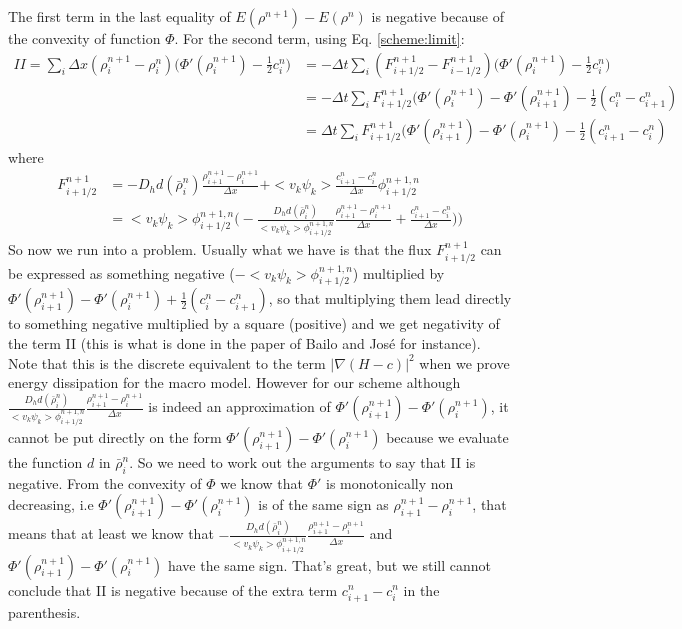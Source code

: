 \documentclass[review,onefignum,onetabnum]{siamart220329}
\begin{document}
{The first term in the last equality of $E(\rho^{n+1}) - E(\rho^n)$ is negative because of the convexity of function $\Phi$. For the second term, using Eq. \eqref{scheme:limit}:
\begin{equation*}
\begin{split}
II = \sum_i \Delta x (\rho_i^{n+1} - \rho_i^n) \big( \Phi'(\rho_i^{n+1}) - \frac{1}{2} c_i^n ) &= - \Delta t \sum_i (F_{i+1/2}^{n+1} - F_{i-1/2}^{n+1}) \big( \Phi'(\rho_i^{n+1}) - \frac{1}{2} c_i^n ) \\
&= - \Delta t \sum_i F_{i+1/2}^{n+1} \big( \Phi'(\rho_i^{n+1}) - \Phi'(\rho_{i+1}^{n+1})  -\frac{1}{2} (c_i^n - c_{i+1}^{n} )\\
&=  \Delta t \sum_i F_{i+1/2}^{n+1} \big( \Phi'(\rho_{i+1}^{n+1}) - \Phi'(\rho_i^{n+1})  -\frac{1}{2} ( c_{i+1}^{n} - c_i^n)
\end{split}
\end{equation*}
where
\begin{equation*}
\begin{split}
F_{i+1/2}^{n+1} &= - D_h d(\bar{\rho}_i^n) \frac{\rho_{i+1}^{n+1} - \rho_i^{n+1}}{\Delta x} + <v_k \psi_k> \frac{c_{i+1}^{n} - c_i^{n}}{\Delta x} \phi_{i+1/2}^{n+1,n} \\
&= <v_k \psi_k>\phi_{i+1/2}^{n+1,n} \bigg(- \frac{D_h d(\bar{\rho}_i^n)}{<v_k \psi_k> \phi_{i+1/2}^{n+1,n}} \frac{\rho_{i+1}^{n+1} - \rho_i^{n+1}}{\Delta x} +  \frac{c_{i+1}^{n} - c_i^{n}}{\Delta x} )\bigg)
\end{split}
\end{equation*}
So now we run into a problem. Usually what we have is that the flux $F_{i+1/2}^{n+1}$ can be expressed as something negative ($-<v_k \psi_k>\phi_{i+1/2}^{n+1,n}$) multiplied by $\Phi'(\rho_{i+1}^{n+1}) - \Phi'(\rho_i^{n+1})  +\frac{1}{2} (c_i^n - c_{i+1}^{n})$, so that multiplying them lead directly to something negative multiplied by a square (positive) and we get negativity of the term II (this is what is done in the paper of Bailo and José for instance). Note that this is the discrete equivalent to the term $|\nabla (H-c)|^2$ when we prove energy dissipation for the macro model.  However for our scheme although $ \frac{D_h d(\bar{\rho}_i^n)}{<v_k \psi_k> \phi_{i+1/2}^{n+1,n}} \frac{\rho_{i+1}^{n+1} - \rho_i^{n+1}}{\Delta x}$ is indeed an approximation of $\Phi'(\rho_{i+1}^{n+1}) - \Phi'(\rho_i^{n+1})$, it cannot be put directly on the form $\Phi'(\rho_{i+1}^{n+1}) - \Phi'(\rho_i^{n+1})$ because we evaluate the function $d$ in $\bar{\rho}_i^n$. So we need to work out the arguments to say that II is negative. From the convexity of $\Phi$ we know that $\Phi'$ is monotonically non decreasing, i.e $\Phi'(\rho_{i+1}^{n+1}) - \Phi'(\rho_i^{n+1})$ is of the same sign as $\rho_{i+1}^{n+1} - \rho_i^{n+1}$, that means that at least we know that $- \frac{D_h d(\bar{\rho}_i^n)}{<v_k \psi_k> \phi_{i+1/2}^{n+1,n}} \frac{\rho_{i+1}^{n+1} - \rho_i^{n+1}}{\Delta x}$ and $\Phi'(\rho_{i+1}^{n+1}) - \Phi'(\rho_i^{n+1})$ have the same sign. That's great, but we still cannot conclude that II is negative because of the extra term $c_{i+1}^{n} - c_i^{n}$ in the parenthesis. 

}
\end{document}
